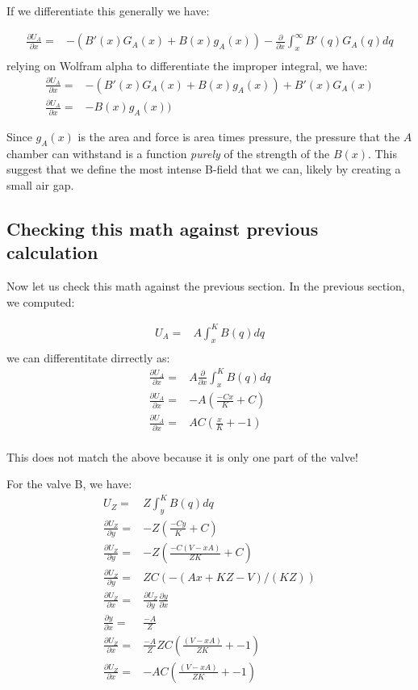 \documentclass{asme2ej}
\begin{document}
If we differentiate this generally we have:

\begin{align}
  \frac{\partial U_A}{\partial x}= & - (B'(x) G_A(x) + B(x) g_A(x ))  -  \frac{\partial }{\partial x}\int_x^\infty B'(q) G_A(q) dq \\
\end{align}
relying on Wolfram alpha to differentiate the improper integral, we have:
\begin{align}
  \frac{\partial U_A}{\partial x}= & - (B'(x) G_A(x) + B(x) g_A(x ))  +  B'(x) G_A(x) \\
  \frac{\partial U_A}{\partial x}= &  - B(x) g_A(x ))
\end{align}

Since $g_A(x)$ is the area and force is area times pressure, the pressure that the $A$ chamber
can withstand is a function {\em purely} of the strength of the $B(x)$. This suggest that we
define the most intense B-field that we can, likely by creating a small air gap.

\subsection{Checking this math against previous calculation}

Now let us check this math against the previous section.
In the previous section, we computed:

\begin{align}
  U_A = & A \int_x^K B(q) dq \\
\end{align}
we can differentitate dirrectly as:
\begin{align}
  \frac{\partial U_A}{\partial x} = & A \frac{\partial}{\partial x} \int_x^K B(q) dq \\
  \frac{\partial U_A}{\partial x} = & -A (\frac{-Cx}{K} + C) \\
  \frac{\partial U_A}{\partial x} = &  AC(\frac{x}{K} + -1) \\
\end{align}

This does not match the above because it is only one part of the valve!

For the valve B, we have:
\begin{align}
  U_Z = & Z \int_y^K B(q) dq \\
  \frac{\partial U_Z}{\partial y} = & - Z (\frac{-Cy}{K} + C) \\
  \frac{\partial U_Z}{\partial y} = & - Z (\frac{-C(V-xA)}{ZK} + C) \\
  \frac{\partial U_Z}{\partial y} = &  Z C(-(A x + K Z - V)/(K Z)) \\
  \frac{\partial U_Z}{\partial x} = &  \frac{\partial U_Z}{\partial y} \frac{\partial y}{\partial x}\\
  \frac{\partial y}{\partial x}  =  & \frac{-A}{Z}\\
  \frac{\partial U_Z}{\partial x} = & \frac{-A}{Z} Z C(\frac{(V-xA)}{ZK} + -1) \\
  \frac{\partial U_Z}{\partial x} = & -A C(\frac{(V-xA)}{ZK} + -1) \\
\end{align}
\end{document}
